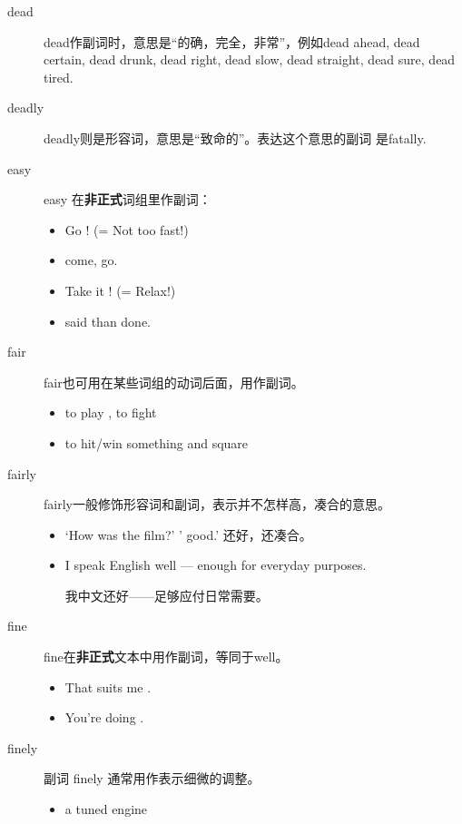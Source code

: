 \begin{description}
\item[dead] dead作副词时，意思是“的确，完全，非常”，例如dead ahead, dead
  certain, dead drunk, dead right, dead slow, dead straight, dead sure, dead tired.

\item[deadly] deadly则是形容词，意思是“致命的”。表达这个意思的副词
  是fatally.
\item[easy] easy 在\textbf{非正式}词组里作副词：
  \begin{itemize}
  \item Go ! (= Not too fast!)
  \item {} come,  go.
  \item Take it ! (= Relax!)
  \item {} said than done.
  \end{itemize}

\item[fair] fair也可用在某些词组的动词后面，用作副词。
  \begin{itemize}
  \item to play , to fight 
  \item to hit/win something  and square
  \end{itemize}

\item[fairly] fairly一般修饰形容词和副词，表示并不怎样高，凑合的意思。
  \begin{itemize}
  \item `How was the film?' ' good.' 还好，还凑合。

  \item I speak English  well --- enough for everyday purposes.

    我中文还好——足够应付日常需要。
  \end{itemize}

\item[fine] fine在\textbf{非正式}文本中用作副词，等同于well。
  \begin{itemize}
  \item That suits me .

  \item You're doing .
  \end{itemize}

\item[finely] 副词 finely 通常用作表示细微的调整。
  \begin{itemize}
  \item a  tuned engine


\end{itemize}
\end{description}
